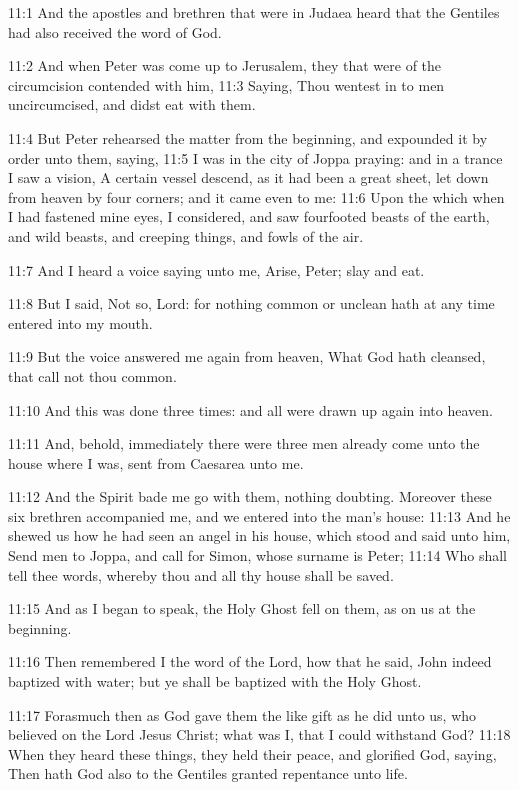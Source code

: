 11:1 And the apostles and brethren that were in Judaea heard that the Gentiles had also received the word of God.

11:2 And when Peter was come up to Jerusalem, they that were of the circumcision contended with him, 11:3 Saying, Thou wentest in to men uncircumcised, and didst eat with them.

11:4 But Peter rehearsed the matter from the beginning, and expounded it by order unto them, saying, 11:5 I was in the city of Joppa praying: and in a trance I saw a vision, A certain vessel descend, as it had been a great sheet, let down from heaven by four corners; and it came even to me: 11:6 Upon the which when I had fastened mine eyes, I considered, and saw fourfooted beasts of the earth, and wild beasts, and creeping things, and fowls of the air.

11:7 And I heard a voice saying unto me, Arise, Peter; slay and eat.

11:8 But I said, Not so, Lord: for nothing common or unclean hath at any time entered into my mouth.

11:9 But the voice answered me again from heaven, What God hath cleansed, that call not thou common.

11:10 And this was done three times: and all were drawn up again into heaven.

11:11 And, behold, immediately there were three men already come unto the house where I was, sent from Caesarea unto me.

11:12 And the Spirit bade me go with them, nothing doubting. Moreover these six brethren accompanied me, and we entered into the man's house: 11:13 And he shewed us how he had seen an angel in his house, which stood and said unto him, Send men to Joppa, and call for Simon, whose surname is Peter; 11:14 Who shall tell thee words, whereby thou and all thy house shall be saved.

11:15 And as I began to speak, the Holy Ghost fell on them, as on us at the beginning.

11:16 Then remembered I the word of the Lord, how that he said, John indeed baptized with water; but ye shall be baptized with the Holy Ghost.

11:17 Forasmuch then as God gave them the like gift as he did unto us, who believed on the Lord Jesus Christ; what was I, that I could withstand God?  11:18 When they heard these things, they held their peace, and glorified God, saying, Then hath God also to the Gentiles granted repentance unto life.

